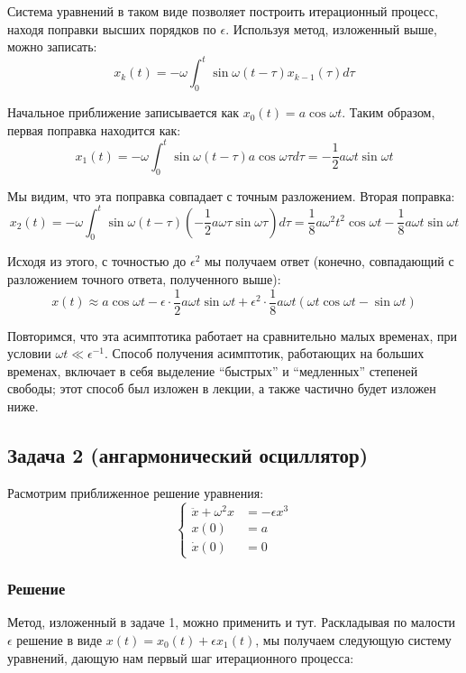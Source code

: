 \documentclass[a4paper,12pt]{article}
\begin{document}
 \noindent
Система уравнений в таком виде позволяет построить итерационный процесс,
находя поправки высших порядков по $\epsilon$. Используя метод, изложенный
выше, можно записать:
\[
x_{k}(t)=-\omega\int_{0}^{t}\sin\omega(t-\tau)x_{k-1}(\tau)d\tau
\]

 \noindent
Начальное приближение записывается как $x_{0}(t)=a\cos\omega t$.
Таким образом, первая поправка находится как:
\[
x_{1}\left(t\right)=-\omega\int_{0}^{t}\sin\omega(t-\tau)a\cos\omega\tau d\tau=-\frac{1}{2}a\omega t\sin\omega t
\]

 \noindent
Мы видим, что эта поправка совпадает с точным разложением. Вторая
поправка:
\[
x_{2}(t)=-\omega\int_{0}^{t}\sin\omega(t-\tau)\left(-\frac{1}{2}a\omega\tau\sin\omega\tau\right)d\tau=\frac{1}{8}a\omega^{2}t^{2}\cos\omega t-\frac{1}{8}a\omega t\sin\omega t
\]

 \noindent
Исходя из этого, с точностью до $\epsilon^{2}$ мы получаем ответ
(конечно, совпадающий с разложением точного ответа, полученного выше):
\[
x(t)\approx a\cos\omega t-\epsilon\cdot\frac{1}{2}a\omega t\sin\omega t+\epsilon^{2}\cdot\frac{1}{8}a\omega t(\omega t\cos\omega t-\sin\omega t)
\]

 \noindent
Повторимся, что эта асимптотика работает на сравнительно малых временах,
при условии $\omega t\ll\epsilon^{-1}$. Способ получения асимптотик,
работающих на больших временах, включает в себя выделение ``быстрых''
и ``медленных'' степеней свободы; этот способ был изложен в лекции,
а также частично будет изложен ниже.


\subsection*{Задача 2 (ангармонический осциллятор)}

Расмотрим приближенное решение уравнения:
\[
\begin{cases}
\ddot{x}+\omega^{2}x & =-\epsilon x^{3}\\
x(0) & =a\\
\dot{x}(0) & =0
\end{cases}
\]



\subsubsection*{Решение}

Метод, изложенный в задаче 1, можно применить и тут. Раскладывая по
малости $\epsilon$ решение в виде $x(t)=x_{0}(t)+\epsilon x_{1}(t)$,
мы получаем следующую систему уравнений, дающую нам первый шаг итерационного
процесса:
\end{document}
